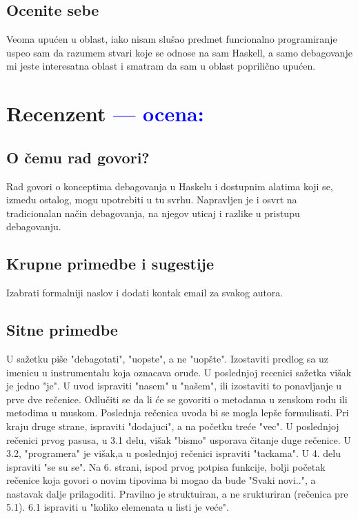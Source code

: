 \documentclass[a4paper]{report}
\newcommand{\odgovor}[1]{\textcolor{blue}{#1}}
\begin{document}
\section{Ocenite sebe}

Veoma upućen u oblast, iako nisam slušao predmet funcionalno  programiranje uspeo sam da razumem stvari koje se odnose na sam Haskell, a samo debagovanje mi jeste interesatna oblast i smatram da sam u oblast poprilično upućen.

\chapter{Recenzent \odgovor{--- ocena:} }


\section{O čemu rad govori?}
Rad govori o konceptima debagovanja u Haskelu i dostupnim alatima koji se, između ostalog, mogu upotrebiti u tu svrhu. Napravljen je i osvrt na tradicionalan način debagovanja, na njegov uticaj i razlike u pristupu debagovanju.

\section{Krupne primedbe i sugestije}
Izabrati formalniji naslov i dodati kontak email za svakog autora. 

\section{Sitne primedbe}
U sažetku piše "debagotati", "uopste", a ne "uopšte". Izostaviti predlog sa uz imenicu u instrumentalu koja oznacava oruđe. U poslednjoj recenici sažetka višak je jedno "je".
U uvod ispraviti "nasem" u "našem", ili izostaviti to ponavljanje u prve dve rečenice. Odlučiti se da li će se govoriti o metodama u zenskom rodu ili metodima u muskom. Poslednja rečenica uvoda bi se mogla lepše formulisati. Pri kraju druge strane, ispraviti "dodajuci", a na početku treće "vec". U poslednjoj rečenici prvog pasusa, u 3.1 delu, višak "bismo" usporava čitanje duge rečenice.
U 3.2, "programera" je višak,a u poslednjoj rečenici ispraviti "tackama". 
U 4. delu ispraviti "se su se".
Na 6. strani, ispod prvog potpisa funkcije, bolji početak rečenice koja govori o novim tipovima bi mogao da bude "Svaki novi..", a nastavak dalje prilagoditi. 
Pravilno je struktuiran, a ne srukturiran (rečenica pre 5.1).
6.1 ispraviti u "koliko elemenata u listi je veće".
\end{document}
